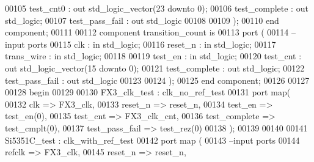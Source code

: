 \begin{DoxyCode}
00105           test_cnt0         : \textcolor{keywordflow}{out} \textcolor{comment}{std\_logic\_vector}(\textcolor{vhdllogic}{}\textcolor{vhdllogic}{23} \textcolor{keywordflow}{downto} \textcolor{vhdllogic}{}\textcolor{vhdllogic}{0});
00106           test_complete : \textcolor{keywordflow}{out} \textcolor{comment}{std\_logic};
00107           test_pass_fail    : \textcolor{keywordflow}{out} \textcolor{comment}{std\_logic}
00108      
00109         );
00110 \textcolor{keywordflow}{end} \textcolor{keywordflow}{component};
00111 
00112 \textcolor{keywordflow}{component} transition_count \textcolor{keywordflow}{is}
00113   \textcolor{keywordflow}{port} (
00114 \textcolor{keyword}{        --input ports }
00115             clk             : \textcolor{keywordflow}{in} \textcolor{comment}{std\_logic};
00116             reset_n         : \textcolor{keywordflow}{in} \textcolor{comment}{std\_logic};
00117             trans_wire      : \textcolor{keywordflow}{in} \textcolor{comment}{std\_logic};
00118           
00119             test_en         : \textcolor{keywordflow}{in} \textcolor{comment}{std\_logic};
00120             test_cnt            : \textcolor{keywordflow}{out} \textcolor{comment}{std\_logic\_vector}(\textcolor{vhdllogic}{}\textcolor{vhdllogic}{15} \textcolor{keywordflow}{downto} \textcolor{vhdllogic}{}\textcolor{vhdllogic}{0});
00121             test_complete   : \textcolor{keywordflow}{out} \textcolor{comment}{std\_logic};
00122             test_pass_fail  : \textcolor{keywordflow}{out} \textcolor{comment}{std\_logic}
00123      
00124         );
00125 \textcolor{keywordflow}{end} \textcolor{keywordflow}{component};
00126 
00127 
00128 \textcolor{vhdlkeyword}{begin}
00129 
00130 FX3\_clk\_test : clk_no_ref_test
00131   \textcolor{keywordflow}{port} \textcolor{keywordflow}{map}(
00132         clk             => FX3_clk,
00133         reset_n         => reset_n,
00134           test_en           => test_en\textcolor{vhdlchar}{(}\textcolor{vhdllogic}{0}\textcolor{vhdlchar}{)},
00135           test_cnt          => FX3_clk_cnt,
00136           test_complete => test_cmplt\textcolor{vhdlchar}{(}\textcolor{vhdllogic}{0}\textcolor{vhdlchar}{)},
00137           test_pass_fail    => test_rez\textcolor{vhdlchar}{(}\textcolor{vhdllogic}{0}\textcolor{vhdlchar}{)}   
00138         \textcolor{vhdlchar}{)};
00139           
00140           
00141 Si5351C\_test : clk_with_ref_test
00142   \textcolor{keywordflow}{port} \textcolor{keywordflow}{map} (
00143 \textcolor{keyword}{        --input ports }
00144         refclk          => FX3_clk,
00145         reset_n         => reset_n,

\end{DoxyCode}
